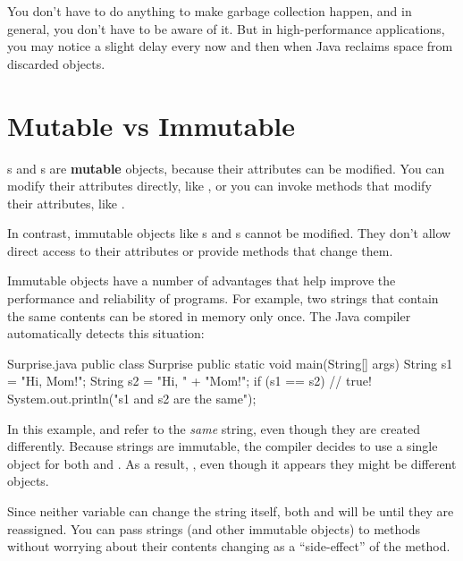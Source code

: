 You don't have to do anything to make garbage collection happen, and in general, you don't have to be aware of it.
But in high-performance applications, you may notice a slight delay every now and then when Java reclaims space from discarded objects.


\section{Mutable vs Immutable}


s and s are {\bf mutable} objects, because their attributes can be modified.
You can modify their attributes directly, like , or you can invoke methods that modify their attributes, like .

In contrast, immutable objects like s and s cannot be modified.
They don't allow direct access to their attributes or provide methods that change them.

Immutable objects have a number of advantages that help improve the performance and reliability of programs.
For example, two strings that contain the same contents can be stored in memory only once.
The Java compiler automatically detects this situation:



\begin{trinket}[265]{Surprise.java}
public class Surprise {
    public static void main(String[] args) {
        String s1 = "Hi, Mom!";
        String s2 = "Hi, " + "Mom!";
        if (s1 == s2) {                // true!
            System.out.println("s1 and s2 are the same");
        }
    }
}
\end{trinket}

In this example,  and  refer to the {\em same} string, even though they are created differently.
Because strings are immutable, the compiler decides to use a single object for both  and .
As a result, , even though it appears they might be different objects.

Since neither variable can change the string itself, both  and  will be  until they are reassigned.
You can pass strings (and other immutable objects) to methods without worrying about their contents changing as a ``side-effect'' of the method.

